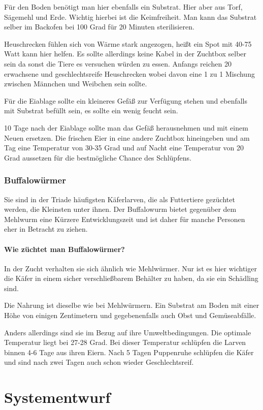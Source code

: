Für den Boden benötigt man hier ebenfalls ein Substrat. Hier aber aus Torf, Sägemehl und Erde. Wichtig hierbei ist die Keimfreiheit. Man kann das Substrat selber im Backofen bei 100 Grad für 20 Minuten sterilisieren.


Heuschrecken fühlen sich von Wärme stark angezogen, heißt ein Spot mit 40-75 Watt kann hier helfen. Es sollte allerdings keine Kabel in der Zuchtbox selber sein da sonst die Tiere es versuchen würden zu essen. Anfangs reichen 20 erwachsene und geschlechtsreife Heuschrecken wobei davon eine 1 zu 1 Mischung zwischen Männchen und Weibchen sein sollte. 

 Für die Eiablage sollte ein kleineres Gefäß zur Verfügung stehen und ebenfalls mit Substrat befüllt sein, es sollte ein wenig feucht sein. 


10 Tage nach der Eiablage sollte man das Gefäß herausnehmen und mit einem Neuen ersetzen. Die frischen Eier in eine andere Zuchtbox hineingeben und am Tag eine Temperatur von 30-35 Grad und auf Nacht eine Temperatur von 20 Grad aussetzen für die bestmögliche Chance des Schlüpfens.

\subsection{Buffalowürmer}
Sie sind in der Triade häufigsten Käferlarven, die als Futtertiere gezüchtet werden, die Kleinsten unter ihnen. Der Buffalowurm bietet gegenüber dem Mehlwurm eine Kürzere Entwicklungszeit und ist daher für manche Personen eher in Betracht zu ziehen.
\subsubsection{Wie züchtet man Buffalowürmer?}
In der Zucht verhalten sie sich ähnlich wie Mehlwürmer. Nur ist es hier wichtiger die Käfer in einem sicher verschließbarem Behälter zu haben, da sie ein Schädling sind.

Die Nahrung ist dieselbe wie bei Mehlwürmern. Ein Substrat am Boden mit einer Höhe von einigen Zentimetern und gegebenenfalls auch Obst und Gemüseabfälle.

Anders allerdings sind sie im Bezug auf ihre Umweltbedingungen. Die optimale Temperatur liegt bei 27-28 Grad. Bei dieser Temperatur schlüpfen die Larven binnen 4-6 Tage aus ihren Eiern. Nach 5 Tagen Puppenruhe schlüpfen die Käfer und sind nach zwei Tagen auch schon wieder Geschlechtsreif.



\chapter{Systementwurf}

